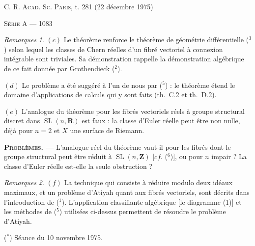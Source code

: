\documentclass[10pt]{amsart}
\theoremstyle{plain}
\theoremstyle{remark}
\newtheorem*{remarques}{Remarques}
\begin{document}
\noindent\begin{minipage}[t]{0.5\textwidth}
\textsc{C. R. Acad. Sc. Paris}, t. 281 (22 d\'{e}cembre 1975)
\end{minipage}%
\begin{minipage}[t]{0.5\textwidth}
\raggedleft
\textsc{S\'{e}rie A} --- 1083
\end{minipage}

\vspace{0.3\baselineskip}

\begin{remarques}
$(c)$ Le th\'{e}or\`{e}me renforce le th\'{e}or\`{e}me de g\'{e}om\'{e}trie diff\'{e}rentielle ($^3$) selon lequel les classes de Chern r\'{e}elles d'un fibr\'{e} vectoriel \`{a} connexion int\'{e}grable sont triviales. Sa d\'{e}monstration rappelle la d\'{e}monstration alg\'{e}brique de ce fait donn\'{e}e par Grothendieck ($^2$).

$(d)$ Le probl\`{e}me a \'{e}t\'{e} sugg\'{e}r\'{e} \`{a} l'un de nous par ($^5$) : le th\'{e}or\`{e}me \'{e}tend le domaine d'applications de calculs qui y sont faits (th.~C.2 et th.~D.2).

$(e)$ L'analogue du th\'{e}or\`{e}me pour les fibr\'{e}s vectoriels r\'{e}els \`{a} groupe structural discret dans $\operatorname{SL}(n,\mathbf{R})$ est faux : la classe d'Euler r\'{e}elle peut \^{e}tre non nulle, d\'{e}j\`{a} pour $n=2$ et $X$ une surface de Riemann.
\end{remarques}

\medskip

\noindent\textbf{\textsc{Probl\`{e}mes}. ---} L'analogue r\'{e}el du th\'{e}or\`{e}me vaut-il pour les fibr\'{e}s dont le groupe structural peut \^{e}tre r\'{e}duit \`{a} $\operatorname{SL}(n,\mathbf{Z})$ [$cf$. ($^6$)], ou pour $n$ impair ? La classe d'Euler r\'{e}elle est-elle la seule obstruction ?

\begin{remarques}
$(f)$ La technique qui consiste \`{a} r\'{e}duire modulo deux id\'{e}aux maximaux, et un probl\`{e}me d'Atiyah quant aux fibr\'{e}s vectoriels, sont d\'{e}crits dans l'introduction de ($^1$). L'application classifiante alg\'{e}brique [le diagramme (1)] et les m\'{e}thodes de ($^5$) utilis\'{e}es ci-dessus permettent de r\'{e}soudre le probl\`{e}me d'Atiyah.
\end{remarques}

\bigskip

\noindent ($^*$) S\'{e}ance du 10 novembre 1975.
\end{document}
